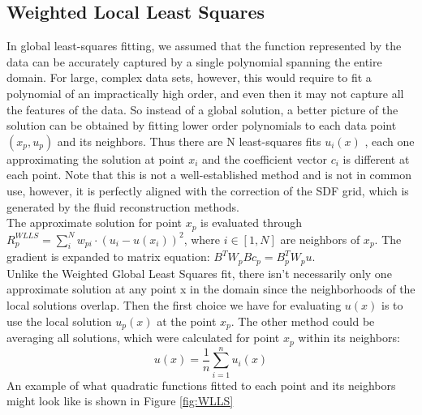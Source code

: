 \subsection{Weighted Local Least Squares}
In global least-squares fitting, we assumed that the function represented by the data can be accurately captured by a single polynomial spanning the entire domain. For large, complex data sets, however, this would require to fit a polynomial of an impractically high order, and even then it may not capture all the features of the data. So instead of a global solution, a better picture of the solution can be obtained by fitting lower order polynomials to each data point $(x_p, u_p)$ and its neighbors. Thus there are N least-squares fits $u_i(x)$ , each one approximating the solution at point $x_i$ and the coefficient vector $c_i$ is different at each point. Note that this is not a well-established method and is not in common use, however, it is perfectly aligned with the correction of the SDF grid, which is generated by the fluid reconstruction methods.\\
The approximate solution for point $x_p$ is evaluated through $R^{WLLS}_p = \sum_i^N w_{pi} \cdot (u_i - u(x_i))^2$, where $i\in [1, N]$ are neighbors of $x_p$. The gradient is expanded to matrix equation: $B^T W_p Bc_p = B_p^T W_p u$.\\
Unlike the Weighted Global Least Squares fit, there isn’t necessarily only one approximate solution at any point x in the domain since the neighborhoods of the local solutions overlap. Then the first choice we have for evaluating $u(x)$ is to use the local solution $u_p(x)$ at the point $x_p$. The other method could be averaging all solutions, which were calculated for point $x_p$ within its neighbors:
\begin{equation}
	u(x) = \dfrac{1}{n} \sum_{i=1}^n{u_i(x)}
\end{equation}
An example of what quadratic functions fitted to each point and its neighbors might look like is shown in Figure \ref{fig:WLLS}
